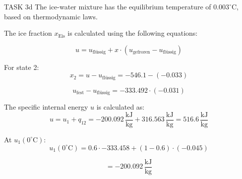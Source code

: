 TASK 3d  
The ice-water mixture has the equilibrium temperature of \( 0.003^\circ\text{C} \), based on thermodynamic laws.

The ice fraction \( x_{\text{Eis}} \) is calculated using the following equations:

\[
u = u_{\text{flüssig}} + x \cdot (u_{\text{gefroren}} - u_{\text{flüssig}})
\]

For state 2:
\[
x_2 = u - u_{\text{flüssig}} = -546.1 - (-0.033)
\]

\[
u_{\text{fest}} - u_{\text{flüssig}} = -333.492 \cdot (-0.031)
\]

The specific internal energy \( u \) is calculated as:
\[
u = u_1 + q_{12} = -200.092 \, \frac{\text{kJ}}{\text{kg}} + 316.563 \, \frac{\text{kJ}}{\text{kg}} = 516.6 \, \frac{\text{kJ}}{\text{kg}}
\]

At \( u_1(0^\circ\text{C}) \):
\[
u_1(0^\circ\text{C}) = 0.6 \cdot -333.458 + (1 - 0.6) \cdot (-0.045)
\]

\[
= -200.092 \, \frac{\text{kJ}}{\text{kg}}
\]